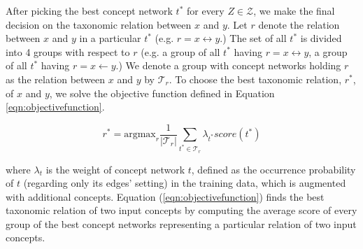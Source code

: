 
After picking the best concept network $t^*$ for every $Z \in
\mathcal{Z}$, we make the final decision on the taxonomic relation
between $x$ and $y$. Let $r$ denote the relation between $x$ and $y$
in a particular $t^*$ (e.g. $r = x \leftrightarrow y$.) The set of all
$t^*$ is divided into 4 groups with respect to $r$ (e.g. a group of
all $t^*$ having $r=x \leftrightarrow y$, a group of all $t^*$
having $r=x \leftarrow y$.) We denote a group with concept networks
holding $r$ as the relation between $x$ and $y$ by
$\mathcal{T}_{r}$. To choose the best taxonomic relation, $r^*$, of
$x$ and $y$, we solve the objective function defined in Equation
\ref{eqn:objectivefunction}.


\begin{equation}
  \label{eqn:objectivefunction}
  r^* = \text{argmax}_{r} \frac {1} {|\mathcal{T}_{r}|} \sum_{t^* \in \mathcal{T}_{r}} \lambda_{t^*} score(t^*)
\end{equation}


where $\lambda_t$ is the weight of concept network $t$, defined as the
occurrence probability of $t$ (regarding only its edges' setting) in
the training data, which is augmented with additional
concepts. Equation (\ref{eqn:objectivefunction}) finds the best
taxonomic relation of two input concepts by computing the average
score of every group of the best concept networks representing a
particular relation of two input concepts. 

